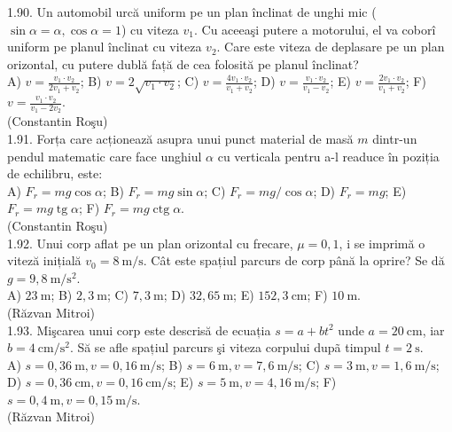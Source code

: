 1.90. Un automobil urcă uniform pe un plan înclinat de unghi mic ($\sin \alpha=\alpha, \cos \alpha=1$) cu viteza $v_{1}$. Cu aceeaşi putere a motorului, el va coborî uniform pe planul înclinat cu viteza $v_{2}$. Care este viteza de deplasare pe un plan orizontal, cu putere dublă față de cea folosită pe planul înclinat?\\ A) $v=\frac{v_{1} \cdot v_{2}}{2 v_{1}+v_{2}}$; B) $v=2 \sqrt{v_{1} \cdot v_{2}}$; C) $v=\frac{4 v_{1} \cdot v_{2}}{v_{1}+v_{2}}$; D) $v=\frac{v_{1} \cdot v_{2}}{v_{1}-v_{2}}$; E) $v=\frac{2 v_{1} \cdot v_{2}}{v_{1}+v_{2}}$; F) $v=\frac{v_{1} \cdot v_{2}}{v_{1}-2 v_{2}}$.\\ (Constantin Roşu)\\

1.91. Forța care acționează asupra unui punct material de masă $m$ dintr-un pendul matematic care face unghiul $\alpha$ cu verticala pentru a-l readuce în poziția de echilibru, este:\\ A) $F_{r}=m g \cos \alpha$; B) $F_{r}=m g \sin \alpha$; C) $F_{r}=m g / \cos \alpha$; D) $F_{r}=m g$; E) $F_{r}=m g \operatorname{tg} \alpha$; F) $F_{r}=m g \operatorname{ctg} \alpha$.\\ (Constantin Roşu)\\

1.92. Unui corp aflat pe un plan orizontal cu frecare, $\mu=0,1$, i se imprimă o viteză inițială $v_{0}=8 \mathrm{~m} / \mathrm{s}$. Cât este spațiul parcurs de corp până la oprire? Se dă $g=9,8 \mathrm{~m} / \mathrm{s}^{2}$.\\ A) $23 \mathrm{~m}$; B) $2,3 \mathrm{~m}$; C) $7,3 \mathrm{~m}$; D) $32,65 \mathrm{~m}$; E) $152,3 \mathrm{~cm}$; F) $10 \mathrm{~m}$.\\ (Răzvan Mitroi)\\

1.93. Mişcarea unui corp este descrisă de ecuația $s=a+b t^{2}$ unde $a=20 \mathrm{~cm}$, iar $b=4 \mathrm{~cm} / \mathrm{s}^{2}$. Să se afle spațiul parcurs şi viteza corpului dupã timpul $t=2 \mathrm{~s}$.\\ A) $s=0,36 \mathrm{~m}, v=0,16 \mathrm{~m} / \mathrm{s}$; B) $s=6 \mathrm{~m}, v=7,6 \mathrm{~m} / \mathrm{s}$; C) $s=3 \mathrm{~m}, v=1,6 \mathrm{~m} / \mathrm{s}$; D) $s=0,36 \mathrm{~cm}, v=0,16 \mathrm{~cm} / \mathrm{s}$; E) $s=5 \mathrm{~m}, v=4,16 \mathrm{~m} / \mathrm{s}$; F) $s=0,4 \mathrm{~m}, v=0,15 \mathrm{~m} / \mathrm{s}$.\\ (Răzvan Mitroi)\\

